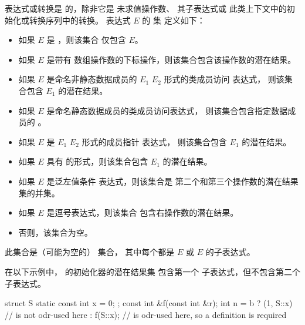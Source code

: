 \pnum
{}%
表达式或转换是  的，除非它是
未求值操作数、
其子表达式或
此类上下文中的初始化或转换序列中的转换。
表达式 $E$ 的  集
定义如下：
\begin{itemize}
\item 如果 $E$ 是
，则该集合
仅包含 $E$。
\item 如果 $E$ 是带有
数组操作数的下标操作，则该集合包含该操作数的潜在结果。
\item 如果 $E$ 是命名非静态数据成员的
$E_1$   $E_2$ 形式的类成员访问
表达式，
则该集合包含 $E_1$ 的潜在结果。
\item 如果 $E$ 是命名静态数据成员的类成员访问表达式，
则该集合包含指定数据成员的 。
\item 如果 $E$ 是 $E_1$  $E_2$ 形式的成员指针
表达式，
则该集合包含 $E_1$ 的潜在结果。
\item 如果 $E$ 具有  的形式，则该集合包含
$E_1$ 的潜在结果。
\item 如果 $E$ 是泛左值条件
表达式，则该集合是
第二个和第三个操作数的潜在结果集的并集。
\item 如果 $E$ 是逗号表达式，则该集合
包含右操作数的潜在结果。
\item 否则，该集合为空。
\end{itemize}
\begin{note}
此集合是（可能为空的） 集合，
其中每个都是 $E$ 或 $E$ 的子表达式。
\begin{example}
在以下示例中， 的初始化器的潜在结果集
包含第一个  子表达式，但不包含第二个
 子表达式。
\begin{codeblock}
struct S { static const int x = 0; };
const int &f(const int &r);
int n = b ? (1, S::x)           //  is not odr-used here
          : f(S::x);            //  is odr-used here, so a definition is required
\end{codeblock}
\end{example}
\end{note}

